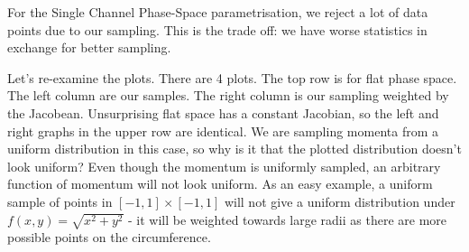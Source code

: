 For the Single Channel Phase-Space parametrisation, we reject a lot of data points due to our sampling. This is the trade off: we have worse statistics in exchange for better sampling.

Let's re-examine the plots. There are 4 plots. The top row is for flat phase space. The left column are our samples. The right column is our sampling weighted by the Jacobean. Unsurprising flat space has a constant Jacobian, so the left and right graphs in the upper row are identical. We are sampling momenta from a uniform distribution in this case, so why is it that the plotted distribution doesn't look uniform? Even though the momentum is uniformly sampled, an arbitrary function of momentum will not look uniform. As an easy example, a uniform sample of points in $[-1,1]\times [-1,1]$ will not give a uniform distribution under $f(x,y)=\sqrt{x^2+y^2}$ - it will be weighted towards large radii as there are more possible points on the circumference. 

